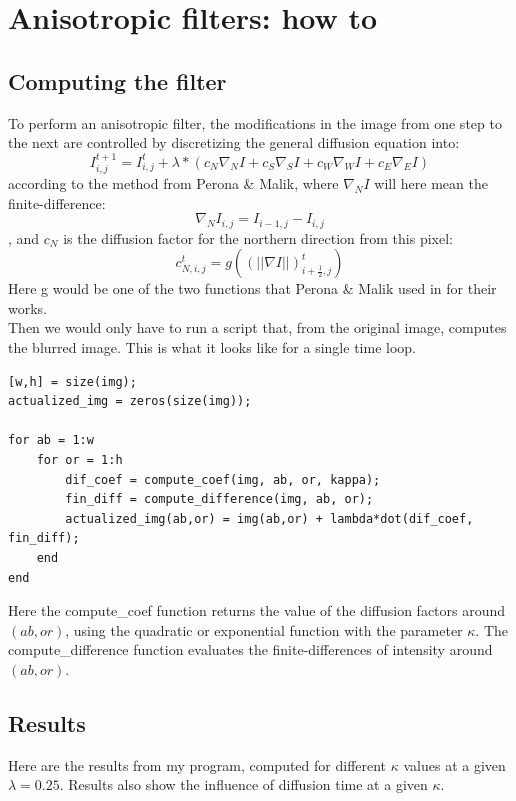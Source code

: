\documentclass[12pt,a4paper]{article}
\begin{document}
\section{Anisotropic filters: how to}

\subsection{Computing the filter}

To perform an anisotropic filter, the modifications in the image from one step to the next are controlled by discretizing the general diffusion equation into:
\begin{equation}
I_{i,j}^{t+1} = I_{i,j}^{t} + \lambda * (c_{N} \nabla_{N}I + c_{S} \nabla_{S}I + c_{W} \nabla_{W}I + c_{E} \nabla_{E}I)
\end{equation}
according to the method from Perona \& Malik,
where $\nabla_{N}I$ will here mean the finite-difference:
\begin{equation}
\nabla_{N}I_{i,j} = I_{i-1,j} - I_{i,j}
\end{equation} , and $c_{N}$ is the diffusion factor for the northern direction from this pixel: 
\begin{equation}
c_{N,i,j}^{t} = g((||\nabla I||)_{i+\frac{1}{2},j}^{t})
\end{equation}
Here g would be one of the two functions that Perona \& Malik used in for their works.
\\
Then we would only have to run a script that, from the original image, computes the blurred image. This is what it looks like for a single time loop.
\begin{lstlisting}
[w,h] = size(img);
actualized_img = zeros(size(img));

for ab = 1:w
	for or = 1:h
		dif_coef = compute_coef(img, ab, or, kappa);
		fin_diff = compute_difference(img, ab, or);
		actualized_img(ab,or) = img(ab,or) + lambda*dot(dif_coef, fin_diff);
	end
end
\end{lstlisting}
Here the compute\_coef function returns the value of the diffusion factors around $(ab,or)$, using the quadratic or exponential function with the parameter $\kappa$.
The compute\_difference function evaluates the finite-differences of intensity around $(ab,or)$.

\subsection{Results}

Here are the results from my program, computed for different $\kappa$ values at a given $\lambda=0.25$. Results also show the influence of diffusion time at a given $\kappa$.
\end{document}
